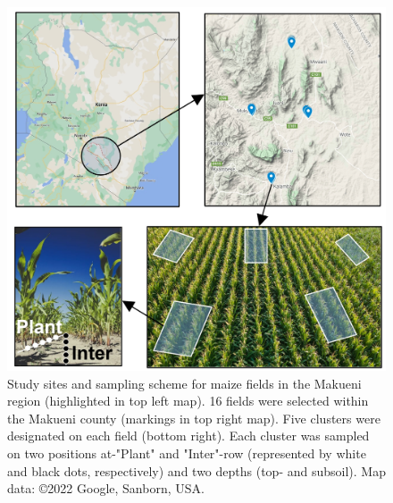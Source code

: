 \begin{refsection}
\begin{figure}[b!]
\centering
\includegraphics[width=1\textwidth]{figures/kenya field sampling.jpg}
\decoRule
\captionsetup{labelfont=bf, justification=justified, singlelinecheck=false, width=1\textwidth}
\caption{Study sites and sampling scheme for maize fields in the Makueni region (highlighted in top left map). 16 fields were selected within the Makueni county (markings in top right map). Five clusters were designated on each field (bottom right). Each cluster was sampled on two positions at-"Plant" and "Inter"-row (represented by white and black dots, respectively) and two depths (top- and subsoil). Map data: ©2022 Google, Sanborn, USA.}
\label{fig:Kenya_sampling}
\end{figure}



\end{refsection}
